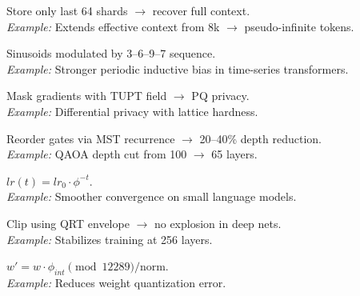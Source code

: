 \begin{tcolorbox}[
	enhanced,
	colback=nrccream!85!white,
	colframe=nrcblue,
	boxrule=0.5mm,
	title=\textbf{4. $\phi^\infty$ KV cache compression}
	]
	Store only last 64 shards $\to$ recover full context. \\
	\textit{Example:} Extends effective context from 8k $\to$ pseudo-infinite tokens.
\end{tcolorbox}

\begin{tcolorbox}[
	enhanced,
	colback=nrccream!85!white,
	colframe=nrcblue,
	boxrule=0.5mm,
	title=\textbf{5. 3--6--9--7 cycle positional encoding}
	]
	Sinusoids modulated by 3--6--9--7 sequence. \\
	\textit{Example:} Stronger periodic inductive bias in time-series transformers.
\end{tcolorbox}

\begin{tcolorbox}[
	enhanced,
	colback=nrccream!85!white,
	colframe=nrcblue,
	boxrule=0.5mm,
	title=\textbf{6. TUPT masking for federated learning}
	]
	Mask gradients with TUPT field $\to$ PQ privacy. \\
	\textit{Example:} Differential privacy with lattice hardness.
\end{tcolorbox}

\begin{tcolorbox}[
	enhanced,
	colback=nrccream!85!white,
	colframe=nrcblue,
	boxrule=0.5mm,
	title=\textbf{7. MST-based gate scheduling}
	]
	Reorder gates via MST recurrence $\to$ 20--40\% depth reduction. \\
	\textit{Example:} QAOA depth cut from 100 $\to$ 65 layers.
\end{tcolorbox}

\begin{tcolorbox}[
	enhanced,
	colback=nrccream!85!white,
	colframe=nrcblue,
	boxrule=0.5mm,
	title=\textbf{8. $\phi^{-1}$ learning rate annealing}
	]
	$lr(t) = lr_0 \cdot \phi^{-t}$. \\
	\textit{Example:} Smoother convergence on small language models.
\end{tcolorbox}

\begin{tcolorbox}[
	enhanced,
	colback=nrccream!85!white,
	colframe=nrcblue,
	boxrule=0.5mm,
	title=\textbf{9. QRT gradient clipping}
	]
	Clip using QRT envelope $\to$ no explosion in deep nets. \\
	\textit{Example:} Stabilizes training at 256 layers.
\end{tcolorbox}

\begin{tcolorbox}[
	enhanced,
	colback=nrccream!85!white,
	colframe=nrcblue,
	boxrule=0.5mm,
	title=\textbf{10. $\phi$-modular weight normalization}
	]
	$w' = w \cdot \phi_{int} \pmod{12289} / \text{norm}$. \\
	\textit{Example:} Reduces weight quantization error.
\end{tcolorbox}
